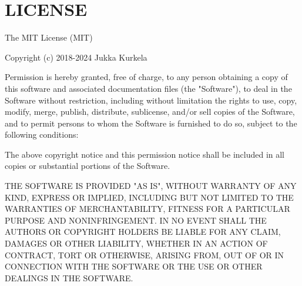 \chapter{LICENSE}
\hypertarget{md_node__modules_2_0dkurkle_2color_2_l_i_c_e_n_s_e}{}\label{md_node__modules_2_0dkurkle_2color_2_l_i_c_e_n_s_e}
The MIT License (MIT)

Copyright (c) 2018-\/2024 Jukka Kurkela

Permission is hereby granted, free of charge, to any person obtaining a copy of this software and associated documentation files (the "{}\+Software"{}), to deal in the Software without restriction, including without limitation the rights to use, copy, modify, merge, publish, distribute, sublicense, and/or sell copies of the Software, and to permit persons to whom the Software is furnished to do so, subject to the following conditions\+:

The above copyright notice and this permission notice shall be included in all copies or substantial portions of the Software.

THE SOFTWARE IS PROVIDED "{}\+AS IS"{}, WITHOUT WARRANTY OF ANY KIND, EXPRESS OR IMPLIED, INCLUDING BUT NOT LIMITED TO THE WARRANTIES OF MERCHANTABILITY, FITNESS FOR A PARTICULAR PURPOSE AND NONINFRINGEMENT. IN NO EVENT SHALL THE AUTHORS OR COPYRIGHT HOLDERS BE LIABLE FOR ANY CLAIM, DAMAGES OR OTHER LIABILITY, WHETHER IN AN ACTION OF CONTRACT, TORT OR OTHERWISE, ARISING FROM, OUT OF OR IN CONNECTION WITH THE SOFTWARE OR THE USE OR OTHER DEALINGS IN THE SOFTWARE. 
